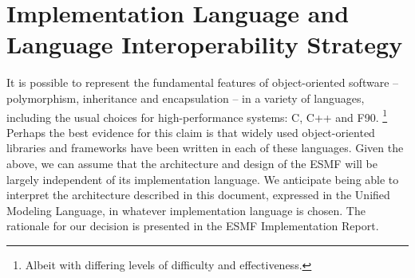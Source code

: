 \section{Implementation Language and Language Interoperability Strategy}

It is possible to represent the fundamental features of object-oriented 
software -- polymorphism, inheritance and encapsulation -- in a variety of languages, 
including the usual choices for high-performance systems: C, C++ and F90. \footnote{Albeit 
with differing levels of difficulty and effectiveness.}  Perhaps the best evidence for 
this claim is that widely used object-oriented libraries and frameworks have been 
written in each of these languages.  Given the above, we can assume that the architecture 
and design of the ESMF will be largely independent of its implementation language.  We
anticipate being able to interpret the architecture described in this document, expressed
in the Unified Modeling Language, in whatever implementation language is chosen.  The rationale for our decision is presented in the ESMF Implementation Report.





